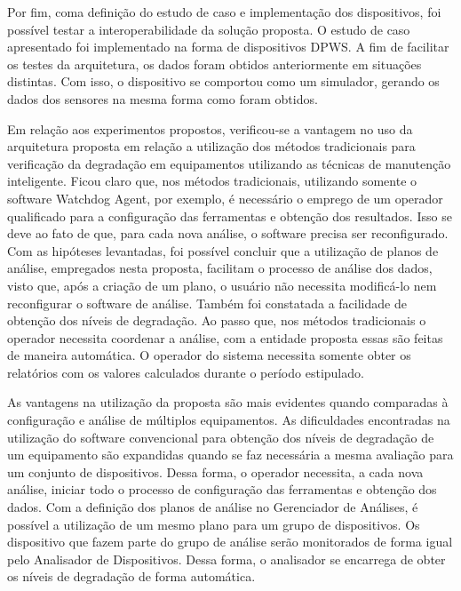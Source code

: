 Por fim, coma definição do estudo de caso e implementação dos dispositivos, foi possível testar a
interoperabilidade da solução proposta. O estudo de caso apresentado foi implementado na forma de
dispositivos \gls{DPWS}. A fim de facilitar os testes da arquitetura, os dados foram obtidos
anteriormente em situações distintas. Com isso, o dispositivo se comportou como um simulador,
gerando os dados dos sensores na mesma forma como foram obtidos.

Em relação aos experimentos propostos, verificou-se a vantagem no uso da arquitetura proposta em
relação a utilização dos métodos tradicionais para verificação da degradação em equipamentos
utilizando as técnicas de manutenção inteligente. Ficou claro que, nos métodos tradicionais,
utilizando somente o software Watchdog Agent, por exemplo, é necessário o emprego de um operador
qualificado para a configuração das ferramentas e obtenção dos resultados. Isso se deve ao fato de
que, para cada nova análise, o software precisa ser reconfigurado. Com as hipóteses levantadas, foi
possível concluir que a utilização de planos de análise, empregados nesta proposta, facilitam o
processo de análise dos dados, visto que, após a criação de um plano, o usuário não necessita
modificá-lo nem reconfigurar o software de análise. Também foi constatada a facilidade de obtenção
dos níveis de degradação. Ao passo que, nos métodos tradicionais o operador necessita coordenar a
análise, com a entidade proposta essas são feitas de maneira automática. O operador do sistema
necessita somente obter os relatórios com os valores calculados durante o período estipulado.

As vantagens na utilização da proposta são mais evidentes quando comparadas à configuração e análise
de múltiplos equipamentos. As dificuldades encontradas na utilização do software convencional para
obtenção dos níveis de degradação de um equipamento são expandidas quando se faz necessária a mesma
avaliação para um conjunto de dispositivos. Dessa forma, o operador necessita, a cada nova análise,
iniciar todo o processo de configuração das ferramentas e obtenção dos dados. Com a definição dos
planos de análise no Gerenciador de Análises, é possível a utilização de um mesmo plano para um
grupo de dispositivos. Os dispositivo que fazem parte do grupo de análise serão monitorados de forma
igual pelo Analisador de Dispositivos. Dessa forma, o analisador se encarrega de obter os níveis de
degradação de forma automática.

